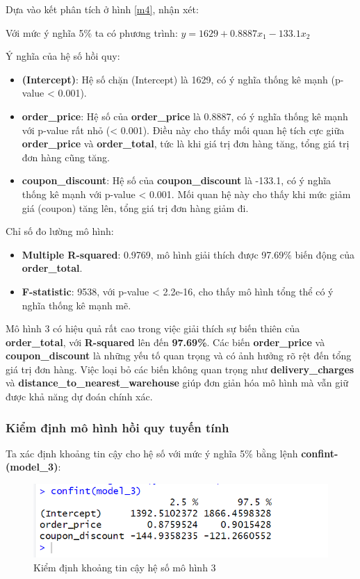 Dựa vào kết phân tích ở hình \ref{m4}, nhận xét:

Với mức ý nghĩa 5\% ta có phương trình: $y= 1629 + 0.8887x_1 - 133.1 x_2$

Ý nghĩa của hệ số hồi quy:
\begin{itemize}
\item\textbf{(Intercept)}: Hệ số chặn (Intercept) là 1629, có ý nghĩa thống kê mạnh (p-value < 0.001).
\item\textbf{order\_price}: Hệ số của \textbf{order\_price} là 0.8887, có ý nghĩa thống kê mạnh với p-value rất nhỏ (< 0.001). Điều này cho thấy mối quan hệ tích cực giữa \textbf{order\_price} và \textbf{order\_total}, tức là khi giá trị đơn hàng tăng, tổng giá trị đơn hàng cũng tăng.
\item\textbf{coupon\_discount}: Hệ số của \textbf{coupon\_discount} là -133.1, có ý nghĩa thống kê mạnh với p-value < 0.001. Mối quan hệ này cho thấy khi mức giảm giá (coupon) tăng lên, tổng giá trị đơn hàng giảm đi.
\end{itemize}

Chỉ số đo lường mô hình:

\begin{itemize}
\item\textbf{Multiple R-squared}: 0.9769, mô hình giải thích được 97.69\% biến động của \textbf{order\_total}.
\item\textbf{F-statistic}: 9538, với p-value < 2.2e-16, cho thấy mô hình tổng thể có ý nghĩa thống kê mạnh mẽ.
\end{itemize}

Mô hình 3 có hiệu quả rất cao trong việc giải thích sự biến thiên của \textbf{order\_total}, với \textbf{R-squared} lên đến \textbf{97.69\%}. Các biến \textbf{order\_price} và \textbf{coupon\_discount} là những yếu tố quan trọng và có ảnh hưởng rõ rệt đến tổng giá trị đơn hàng. Việc loại bỏ các biến không quan trọng như \textbf{delivery\_charges} và \textbf{distance\_to\_nearest\_warehouse} giúp đơn giản hóa mô hình mà vẫn giữ được khả năng dự đoán chính xác.

\subsubsection{Kiểm định mô hình hồi quy tuyến tính}
Ta xác định khoảng tin cậy cho hệ số với mức ý nghĩa 5\% bằng lệnh \textbf{confint-(model\_3)}:
\begin{figure}[H]
  \centering
  \includegraphics[width=0.7\linewidth]{graphics/5.5.5.png}
  \caption{Kiểm định khoảng tin cậy hệ số mô hình 3 }
  \label{m5}
\end{figure}

